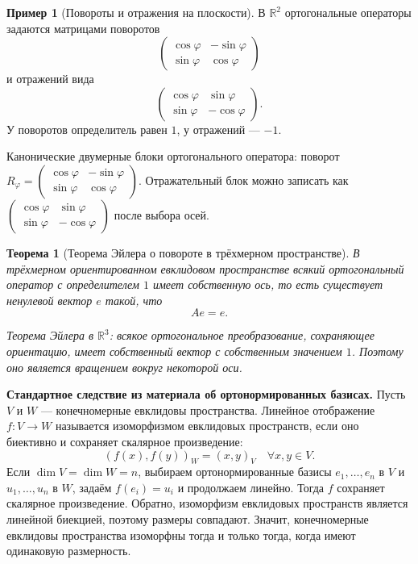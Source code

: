 \documentclass[12pt,a4paper]{article}
\theoremstyle{definition}
\newtheorem{example}[definition]{Пример}
\theoremstyle{plain}
\newtheorem{theorem}[definition]{Теорема}
\theoremstyle{remark}
\newenvironment{planadd}{\begin{planbox}}{\end{planbox}}
\newenvironment{knowledgefix}{\begin{clarifybox}}{\end{clarifybox}}
\newcommand{\R}{\mathbb{R}}
\begin{document}
\begin{example}[Повороты и отражения на плоскости]
В $\R^2$ ортогональные операторы задаются матрицами поворотов
\[
    \begin{pmatrix}
        \cos\varphi & -\sin\varphi\\
        \sin\varphi & \cos\varphi
    \end{pmatrix}
\]
и отражений вида
\[
    \begin{pmatrix}
        \cos\varphi & \sin\varphi\\
        \sin\varphi & -\cos\varphi
    \end{pmatrix}.
\]
У поворотов определитель равен $1$, у отражений --- $-1$.
\begin{knowledgefix}
Канонические двумерные блоки ортогонального оператора: поворот \(R_\varphi=\begin{pmatrix}\cos\varphi&-\sin\varphi\\\sin\varphi&\cos\varphi\end{pmatrix}\). Отражательный блок можно записать как \(\begin{pmatrix}\cos\varphi&\sin\varphi\\\sin\varphi&-\cos\varphi\end{pmatrix}\) после выбора осей.
\end{knowledgefix}
\end{example}

\begin{theorem}[Теорема Эйлера о повороте в трёхмерном пространстве]
В трёхмерном ориентированном евклидовом пространстве всякий ортогональный оператор с определителем $1$ имеет собственную ось, то есть существует ненулевой вектор $e$ такой, что
\[
    Ae=e.
\]
\begin{knowledgefix}
Теорема Эйлера в \(\R^3\): всякое ортогональное преобразование, сохраняющее ориентацию, имеет собственный вектор с собственным значением \(1\). Поэтому оно является вращением вокруг некоторой оси.
\end{knowledgefix}
\end{theorem}
\begin{planadd}
\textbf{Стандартное следствие из материала об ортонормированных базисах.}
Пусть $V$ и $W$ — конечномерные евклидовы пространства. Линейное отображение
$f:V\to W$ называется изоморфизмом евклидовых пространств, если оно биективно и
сохраняет скалярное произведение:
\[
    (f(x),f(y))_W=(x,y)_V \quad \forall x,y\in V.
\]
Если $\dim V=\dim W=n$, выбираем ортонормированные базисы $e_1,\ldots,e_n$ в $V$ и
$u_1,\ldots,u_n$ в $W$, задаём $f(e_i)=u_i$ и продолжаем линейно. Тогда $f$ сохраняет
скалярное произведение. Обратно, изоморфизм евклидовых пространств является линейной
биекцией, поэтому размеры совпадают. Значит, конечномерные евклидовы пространства
изоморфны тогда и только тогда, когда имеют одинаковую размерность.
\end{planadd}
\end{document}
